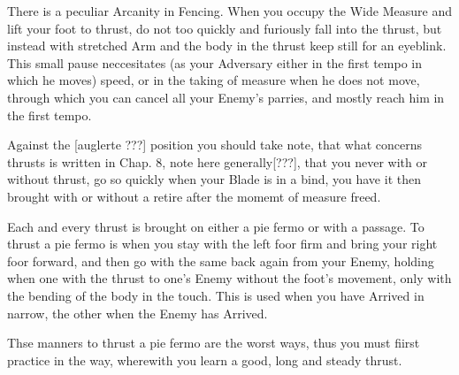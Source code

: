 There is a peculiar Arcanity in Fencing. When you occupy the Wide
Measure and lift your foot to thrust, do not too quickly and furiously
fall into the thrust, but instead with stretched Arm and the body in
the thrust keep still for an eyeblink. This small pause neccesitates  (as your
Adversary either in the first tempo in which he moves) speed, or in
the taking of measure when he does not move, through which you can
cancel all your Enemy's parries, and mostly reach him in the first tempo.


Against the [auglerte ???] position you should take note, that what
concerns thrusts is written in Chap. 8, note here
generally[???], that you
never with or without thrust, go so quickly when your Blade is in a
bind, you have it then brought with or without a retire after the
momemt of measure freed.



Each and every thrust is brought on either a pie fermo or with a
passage. To thrust a pie fermo is when you stay with the left foor
firm and bring your right foor forward, and then go with the same back
again from your Enemy, holding when one with the thrust to one's Enemy
without the foot's movement, only with the bending of the body in the
touch. This is used when you have Arrived in narrow, the other when
the Enemy has Arrived.


Thse manners to thrust a pie fermo are the worst ways, thus you must
fiirst practice in the way, wherewith you learn a good,
long and steady thrust.